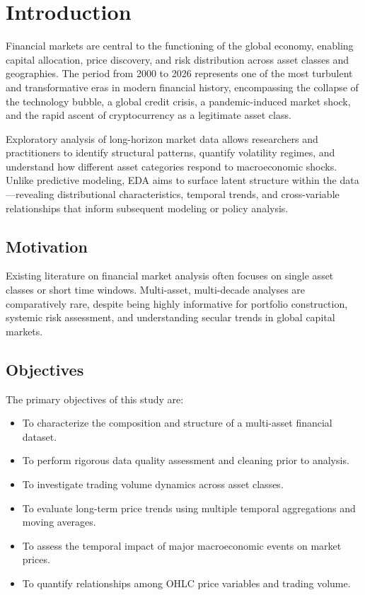 \documentclass[10pt,a4paper,twocolumn]{article}
\begin{document}
\section{Introduction}

Financial markets are central to the functioning of the global economy, enabling capital allocation, price discovery, and risk distribution across asset classes and geographies. The period from 2000 to 2026 represents one of the most turbulent and transformative eras in modern financial history, encompassing the collapse of the technology bubble, a global credit crisis, a pandemic-induced market shock, and the rapid ascent of cryptocurrency as a legitimate asset class.

Exploratory analysis of long-horizon market data allows researchers and practitioners to identify structural patterns, quantify volatility regimes, and understand how different asset categories respond to macroeconomic shocks. Unlike predictive modeling, EDA aims to surface latent structure within the data—revealing distributional characteristics, temporal trends, and cross-variable relationships that inform subsequent modeling or policy analysis.

\subsection{Motivation}

Existing literature on financial market analysis often focuses on single asset classes or short time windows. Multi-asset, multi-decade analyses are comparatively rare, despite being highly informative for portfolio construction, systemic risk assessment, and understanding secular trends in global capital markets.

\subsection{Objectives}

The primary objectives of this study are:
\begin{itemize}[leftmargin=1.2em, itemsep=1pt, topsep=2pt]
  \item To characterize the composition and structure of a multi-asset financial dataset.
  \item To perform rigorous data quality assessment and cleaning prior to analysis.
  \item To investigate trading volume dynamics across asset classes.
  \item To evaluate long-term price trends using multiple temporal aggregations and moving averages.
  \item To assess the temporal impact of major macroeconomic events on market prices.
  \item To quantify relationships among OHLC price variables and trading volume.
\end{itemize}
\end{document}
